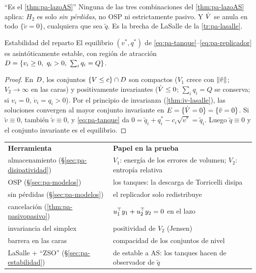 \begin{trampa}[label=tr:pa-teo63]{``Es el \cref{thm:pa-lazoAS}''}
Ninguna de las tres combinaciones del \cref{thm:pa-lazoAS} aplica: $H_2$ es solo \emph{sin pérdidas}, no OSP ni estrictamente pasivo. Y $\dot V$ se anula en todo $\{\tilde v=0\}$, cualquiera que sea $\tilde q$. Es la brecha de LaSalle de la \cref{tr:pa-lasalle}.
\end{trampa}

\begin{teorema}[label=thm:pa-agua]{Estabilidad del reparto \citep{RaQu10}}
El equilibrio $(v^*,q^*)$ de \eqref{eq:pa-tanque}--\eqref{eq:pa-replicador} es asintóticamente estable, con región de atracción $\D=\{v_i\ge0,\ q_i>0,\ \sum_iq_i=Q\}$.
\end{teorema}

\begin{proof}
En $D$, los conjuntos $\{V\le c\}\cap D$ son compactos ($V_1$ crece con $\left\lVert \tilde v\right\rVert$; $V_2\to\infty$ en las caras) y positivamente invariantes ($\dot V\le0$; $\sum_iq_i=Q$ se conserva; si $v_i=0$, $\dot v_i=q_i>0$). Por el principio de invarianza (\cref{thm:iv-lasalle}), las soluciones convergen al mayor conjunto invariante en $E=\{\dot V=0\}=\{\tilde v=0\}$. Si $\tilde v\equiv0$, también $\dot{\tilde v}\equiv0$, y \eqref{eq:pa-tanque} da $0=\tilde q_i+q_i^*-c_i\sqrt{v^*}=\tilde q_i$. Luego $\tilde q\equiv0$ y el conjunto invariante es el equilibrio.
\end{proof}

\begin{ideaclave}
\begin{tabular}{@{}p{4.0cm}p{7.5cm}@{}}
\textbf{Herramienta} & \textbf{Papel en la prueba}\\
almacenamiento (\S\ref{sec:pa-disipatividad}) & $V_1$: energía de los errores de volumen; $V_2$: entropía relativa\\
OSP (\S\ref{sec:pa-modelos}) & los tanques: la descarga de Torricelli disipa\\
sin pérdidas (\S\ref{sec:pa-modelos}) & el replicador solo redistribuye\\
cancelación (\cref{thm:pa-pasivopasivo}) & $u_1^{\top} y_1+u_2^{\top} y_2=0$ en el lazo\\
invariancia del simplex & positividad de $V_2$ (Jensen)\\
barrera en las caras & compacidad de los conjuntos de nivel\\
LaSalle + ``ZSO'' (\S\ref{sec:pa-estabilidad}) & de estable a AS: los tanques hacen de observador de $\tilde q$
\end{tabular}
\end{ideaclave}


